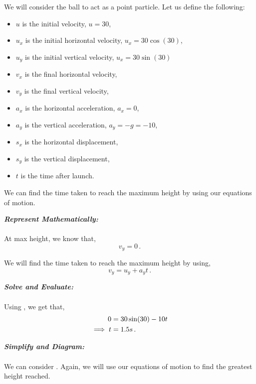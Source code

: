 \begin{subquestions}
We will consider the ball to act as a point particle. Let us define the following:
\begin{itemize}
	\item $u$ is the initial velocity, $u=30$,
	\item $u_x$ is the initial horizontal velocity, $u_x = 30\cos(30)$,
	\item $u_y$ is the initial vertical velocity, $u_x = 30\sin(30)$
	\item $v_x$ is the final horizontal velocity,
	\item $v_y$ is the final vertical velocity,
	\item $a_x$ is the horizontal acceleration, $a_x=0$,
	\item $a_y$ is the vertical acceleration, $a_y=-g=-10$,
	\item $s_x$ is the horizontal displacement,
	\item $s_y$ is the vertical displacement,
	\item $t$ is the time after launch.
\end{itemize}
We can find the time taken to reach the maximum height by using our equations of motion.
	
	
	
	
\textbf{\textit{Represent Mathematically:}} \\ \\
At max height, we know that,
\begin{equation}
	v_y = 0 \,.
\end{equation}

We will find the time taken to reach the maximum height by using,
\begin{equation}
	v_y = u_y + a_yt \label{2005:q5:VEqn1} \,.
\end{equation}	
	



\textbf{\textit{Solve and Evaluate:}} \\ \\
Using , we get that,
\begin{align}
	0 & = 30\sin(30) -10t \nonumber \\
	\implies t & = 1.5s \,. 
\end{align}


\subquestion 

\textbf{\textit{Simplify and Diagram:}} \\ \\
We can consider . Again, we will use our equations of motion to find the greatest height reached. 





\end{subquestions}
